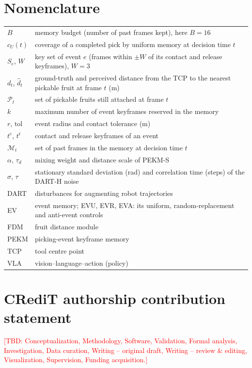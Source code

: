 \documentclass[preprint,12pt,authoryear]{elsarticle}
\newcommand{\tbd}[1]{\textcolor{red}{[TBD: #1]}}
\begin{document}
\section*{Nomenclature}
\begin{tabular}{lp{10.8cm}}
$B$ & memory budget (number of past frames kept), here $B=16$\\
$c_U(t)$ & coverage of a completed pick by uniform memory at decision time $t$\\
$S_e$, $W$ & key set of event $e$ (frames within $\pm W$ of its contact and release keyframes), $W=3$\\
$d_t$, $\hat d_t$ & ground-truth and perceived distance from the TCP to the nearest pickable fruit at frame $t$ (m)\\
$\mathcal{P}_t$ & set of pickable fruits still attached at frame $t$\\
$k$ & maximum number of event keyframes reserved in the memory\\
$r$, $\mathrm{tol}$ & event radius and contact tolerance (m)\\
$t^{\mathrm{c}}$, $t^{\mathrm{r}}$ & contact and release keyframes of an event\\
$\mathcal{M}_t$ & set of past frames in the memory at decision time $t$\\
$\alpha$, $\tau_d$ & mixing weight and distance scale of PEKM-S\\
$\sigma$, $\tau$ & stationary standard deviation (rad) and correlation time (steps) of the DART-H noise\\
DART & disturbances for augmenting robot trajectories \citep{laskey2017dart}\\
EV & event memory; EVU, EVR, EVA: its uniform, random-replacement and anti-event controls\\
FDM & fruit distance module\\
PEKM & picking-event keyframe memory\\
TCP & tool centre point\\
VLA & vision--language--action (policy)\\
\end{tabular}










\section*{CRediT authorship contribution statement}
\tbd{Conceptualization, Methodology, Software, Validation, Formal analysis, Investigation, Data curation, Writing -- original draft, Writing -- review \& editing, Visualization, Supervision, Funding acquisition.}
\end{document}
